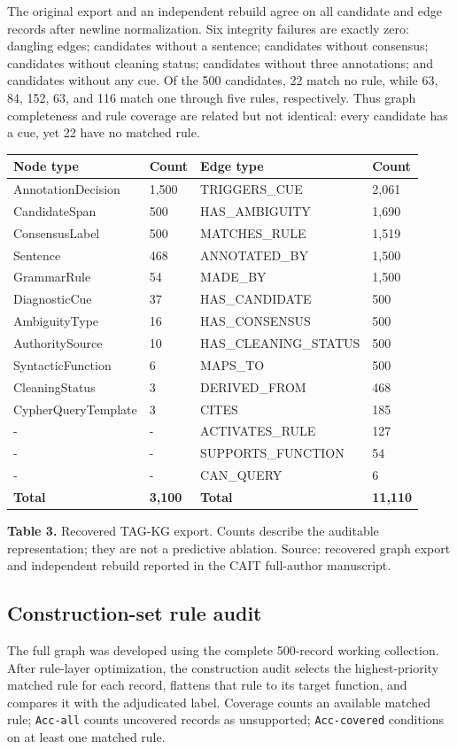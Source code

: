 \documentclass{CUP-JNL-NLP}
\begin{document}
The original export and an independent rebuild agree on all candidate and edge records after newline normalization. Six integrity failures are exactly zero: dangling edges; candidates without a sentence; candidates without consensus; candidates without cleaning status; candidates without three annotations; and candidates without any cue. Of the 500 candidates, 22 match no rule, while 63, 84, 152, 63, and 116 match one through five rules, respectively. Thus graph completeness and rule coverage are related but not identical: every candidate has a cue, yet 22 have no matched rule.

\begin{table}[htbp]\centering\small\begin{tabularx}{\linewidth}{lXXX}\toprule
Node type & Count & Edge type & Count \\ \midrule
AnnotationDecision & 1,500 & TRIGGERS\_CUE & 2,061 \\
CandidateSpan & 500 & HAS\_AMBIGUITY & 1,690 \\
ConsensusLabel & 500 & MATCHES\_RULE & 1,519 \\
Sentence & 468 & ANNOTATED\_BY & 1,500 \\
GrammarRule & 54 & MADE\_BY & 1,500 \\
DiagnosticCue & 37 & HAS\_CANDIDATE & 500 \\
AmbiguityType & 16 & HAS\_CONSENSUS & 500 \\
AuthoritySource & 10 & HAS\_CLEANING\_STATUS & 500 \\
SyntacticFunction & 6 & MAPS\_TO & 500 \\
CleaningStatus & 3 & DERIVED\_FROM & 468 \\
CypherQueryTemplate & 3 & CITES & 185 \\
- & - & ACTIVATES\_RULE & 127 \\
- & - & SUPPORTS\_FUNCTION & 54 \\
- & - & CAN\_QUERY & 6 \\
\textbf{Total} & \textbf{3,100} & \textbf{Total} & \textbf{11,110} \\
\bottomrule\end{tabularx}\end{table}
\textbf{Table 3.} Recovered TAG-KG export. Counts describe the auditable representation; they are not a predictive ablation. Source: recovered graph export and independent rebuild reported in the CAIT full-author manuscript.

\subsection{Construction-set rule audit}
The full graph was developed using the complete 500-record working collection. After rule-layer optimization, the construction audit selects the highest-priority matched rule for each record, flattens that rule to its target function, and compares it with the adjudicated label. Coverage counts an available matched rule; \texttt{Acc-all} counts uncovered records as unsupported; \texttt{Acc-covered} conditions on at least one matched rule.
\end{document}
